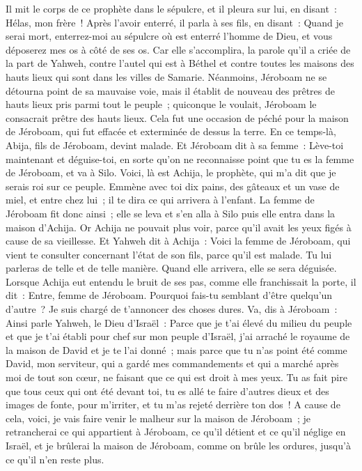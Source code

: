 \begin{multicols}{2}
Il mit le corps de ce prophète dans le sépulcre, et il pleura sur lui, en disant~: Hélas, mon frère~!
Après l'avoir enterré, il parla à ses fils, en disant~: Quand je serai mort, enterrez-moi au sépulcre où est enterré l'homme de Dieu, et vous déposerez mes os à côté de ses os.
Car elle s'accomplira, la parole qu'il a criée de la part de Yahweh, contre l'autel qui est à Béthel et contre toutes les maisons des hauts lieux qui sont dans les villes de Samarie.
Néanmoins, Jéroboam ne se détourna point de sa mauvaise voie, mais il établit de nouveau des prêtres de hauts lieux pris parmi tout le peuple~; quiconque le voulait, Jéroboam le consacrait prêtre des hauts lieux.
Cela fut une occasion de péché pour la maison de Jéroboam, qui fut effacée et exterminée de dessus la terre.
\VerseOne{}En ce temps-là, Abija, fils de Jéroboam, devint malade.
Et Jéroboam dit à sa femme~: Lève-toi maintenant et déguise-toi, en sorte qu'on ne reconnaisse point que tu es la femme de Jéroboam, et va à Silo. Voici, là est Achija, le prophète, qui m'a dit que je serais roi sur ce peuple.
Emmène avec toi dix pains, des gâteaux et un vase de miel, et entre chez lui~; il te dira ce qui arrivera à l'enfant.
La femme de Jéroboam fit donc ainsi~; elle se leva et s'en alla à Silo puis elle entra dans la maison d'Achija. Or Achija ne pouvait plus voir, parce qu'il avait les yeux figés à cause de sa vieillesse.
Et Yahweh dit à Achija~: Voici la femme de Jéroboam, qui vient te consulter concernant l'état de son fils, parce qu'il est malade. Tu lui parleras de telle et de telle manière. Quand elle arrivera, elle se sera déguisée.
Lorsque Achija eut entendu le bruit de ses pas, comme elle franchissait la porte, il dit~: Entre, femme de Jéroboam. Pourquoi fais-tu semblant d'être quelqu'un d'autre~? Je suis chargé de t'annoncer des choses dures.
Va, dis à Jéroboam~: Ainsi parle Yahweh, le Dieu d'Israël~: Parce que je t'ai élevé du milieu du peuple et que je t'ai établi pour chef sur mon peuple d'Israël,
j'ai arraché le royaume de la maison de David et je te l'ai donné~; mais parce que tu n'as point été comme David, mon serviteur, qui a gardé mes commandements et qui a marché après moi de tout son cœur, ne faisant que ce qui est droit à mes yeux.
Tu as fait pire que tous ceux qui ont été devant toi, tu es allé te faire d'autres dieux et des images de fonte, pour m'irriter, et tu m'as rejeté derrière ton dos~!
A cause de cela, voici, je vais faire venir le malheur sur la maison de Jéroboam~; je retrancherai ce qui appartient à Jéroboam, ce qu'il détient et ce qu'il néglige en Israël, et je brûlerai la maison de Jéroboam, comme on brûle les ordures, jusqu'à ce qu'il n'en reste plus.

\end{multicols}
